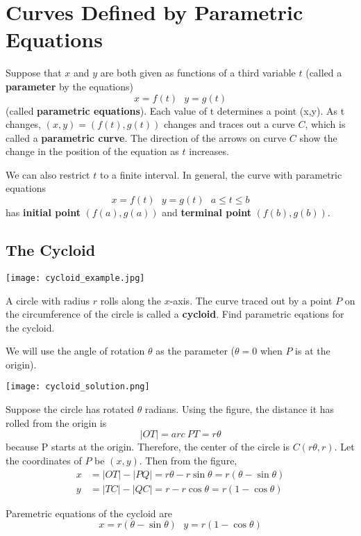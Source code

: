 \section{Curves Defined by Parametric Equations}
  Suppose that $x$ and $y$ are both given as functions of a third variable $t$ (called a \textbf{parameter} by the equations)
    $$ x = f(t) \ \ \ y = g(t) $$
  (called \textbf{parametric equations}). Each value of t determines a point (x,y). As t changes, $ (x,y) = (f(t),g(t)) $ changes and traces out a curve $C$, which is called a \textbf{parametric curve}. The direction of the arrows on curve $C$ show the change in the position of the equation as $t$ increases.

  We can also restrict $t$ to a finite interval. In general, the curve with parametric equations
    $$ x = f(t) \ \ \ y = g(t) \ \ \ a \leq t \leq b $$
  has \textbf{initial point} $(f(a),g(a))$ and \textbf{terminal point} $(f(b),g(b))$.

  \subsection*{The Cycloid}
    \begin{center}
      \texttt{[image: cycloid\_example.jpg]}
    \end{center}
    \begin{example}
      A circle with radius $r$ rolls along the $x$-axis. The curve traced out by a point $P$ on the circumference of the circle is called a \textbf{cycloid}. Find parametric eqations for the cycloid.
    \end{example}
    \begin{solution}
      We will use the angle of rotation $\theta$ as the parameter ($\theta = 0$ when $P$ is at the origin).
      \begin{center}
        \texttt{[image: cycloid\_solution.png]}
      \end{center}
      Suppose the circle has rotated $\theta$ radians. Using the figure, the distance it has rolled from the origin is
        $$ |OT| = arc\ PT = r\theta$$
      because P starts at the origin. Therefore, the center of the circle is $C(r\theta,r)$. Let the coordinates of $P$ be $(x,y)$. Then from the figure,
      \begin{align*}
        x &= |OT| - |PQ| = r\theta - r\sin\theta = r(\theta-\sin\theta)\\
        y &= |TC| - |QC| = r - r\cos\theta = r(1-\cos\theta)
      \end{align*}
    \end{solution}
    \begin{definition}
      Paremetric equations of the cycloid are
      $$ x = r(\theta-\sin\theta) \ \ \ y = r(1-\cos\theta)$$
    \end{definition}